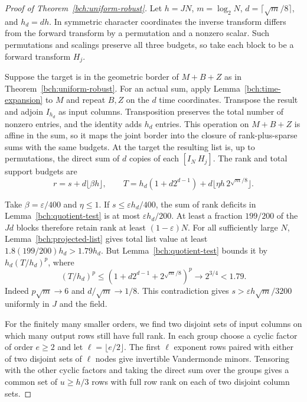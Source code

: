 \begin{proof}[Proof of Theorem~\ref{bch:uniform-robust}]
Let $h=JN$, $m=\log_2 N$, $d=\lceil\sqrt m/8\rceil$, and $h_d=dh$.
In symmetric character coordinates the inverse transform differs from
the forward transform by a permutation and a nonzero scalar. Such
permutations and scalings preserve all three budgets, so take each
block to be a forward transform $H_j$.

Suppose the target is in the geometric border of $M+B+Z$ as in
Theorem~\ref{bch:uniform-robust}. For an actual sum, apply
Lemma~\ref{bch:time-expansion} to $M$ and repeat $B,Z$ on the $d$
time coordinates. Transpose the result and adjoin $I_{h_d}$ as
input columns. Transposition preserves the total number of nonzero
entries, and the identity adds $h_d$ entries. This operation on
$M+B+Z$ is affine in the sum, so it maps the joint border into
the closure of rank-plus-sparse sums with the same budgets. At the
target the resulting list is, up to permutations, the direct sum of
$d$ copies of each $[I_N\ H_j]$. The rank and total support budgets are
\[
 r=s+d\lfloor\beta h\rfloor,\qquad
 T=h_d(1+d2^{d-1})+d\lfloor\eta h\,2^{\sqrt m/8}\rfloor .
\]

Take $\beta=\varepsilon/400$ and $\eta\le1$. If
$s\le\varepsilon h_d/400$, the sum of rank deficits in
Lemma~\ref{bch:quotient-test} is at most $\varepsilon h_d/200$.
At least a fraction $199/200$ of the $Jd$ blocks therefore retain
rank at least $(1-\varepsilon)N$. For all sufficiently large $N$,
Lemma~\ref{bch:projected-list} gives total list value at least
$1.8(199/200)h_d>1.79h_d$. But Lemma~\ref{bch:quotient-test}
bounds it by $h_d(T/h_d)^p$, where
\[
 (T/h_d)^p\le (1+d2^{d-1}+2^{\sqrt m/8})^p
       \longrightarrow 2^{3/4}<1.79 .
\]
Indeed $p\sqrt m\to6$ and $d/\sqrt m\to1/8$. This contradiction
gives $s>\varepsilon h\sqrt m/3200$ uniformly in $J$ and the field.

For the finitely many smaller orders, we find two disjoint sets of
input columns on which many output rows still have full rank. In each
group choose a cyclic factor of order $e\ge2$ and let
$\ell=\lfloor e/2\rfloor$. The first $\ell$ exponent rows paired
with either of two disjoint sets of $\ell$ nodes give invertible
Vandermonde minors. Tensoring with the other cyclic factors and taking
the direct sum over the groups gives a common set of $u\ge h/3$
rows with full row rank on each of two disjoint column sets.


\end{proof}
